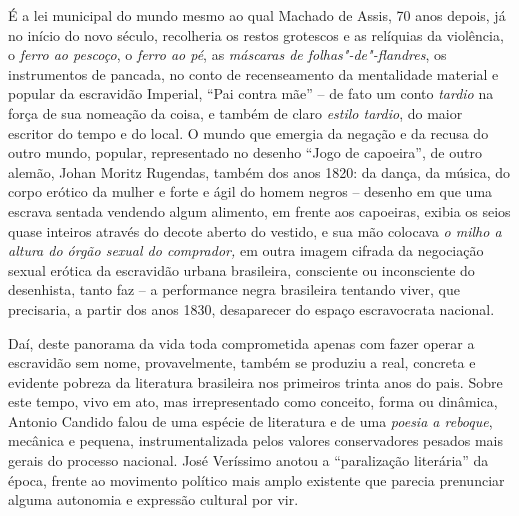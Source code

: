 É a lei municipal do mundo mesmo ao qual Machado de Assis, 70 anos
depois, já no início do novo século, recolheria os restos grotescos e as
relíquias da violência, o \emph{ferro ao pescoço}, o \emph{ferro ao pé},
as \emph{máscaras de folhas"-de"-flandres}, os instrumentos de pancada, no
conto de recenseamento da mentalidade material e popular da escravidão
Imperial, ``Pai contra mãe'' -- de fato um conto \emph{tardio} na força
de sua nomeação da coisa, e também de claro \emph{estilo tardio}, do
maior escritor do tempo e do local. O mundo que emergia da negação e da
recusa do outro mundo, popular, representado no desenho ``Jogo de
capoeira'', de outro alemão, Johan Moritz Rugendas, também dos anos
1820: da dança, da música, do corpo erótico da mulher e forte e ágil do
homem negros -- desenho em que uma escrava sentada vendendo algum
alimento, em frente aos capoeiras, exibia os seios quase inteiros
através do decote aberto do vestido, e sua mão colocava \emph{o milho a
altura do órgão sexual do comprador,} em outra imagem cifrada da
negociação sexual erótica da escravidão urbana brasileira, consciente ou
inconsciente do desenhista, tanto faz -- a performance negra brasileira
tentando viver, que precisaria, a partir dos anos 1830, desaparecer do
espaço escravocrata nacional.

Daí, deste panorama da vida toda comprometida apenas com fazer operar a
escravidão sem nome, provavelmente, também se produziu a real, concreta
e evidente pobreza da literatura brasileira nos primeiros trinta anos do
pais. Sobre este tempo, vivo em ato, mas irrepresentado como conceito,
forma ou dinâmica, Antonio Candido falou de uma espécie de literatura e
de uma \emph{poesia a reboque}, mecânica e pequena, instrumentalizada
pelos valores conservadores pesados mais gerais do processo nacional.
José Veríssimo anotou a ``paralização literária'' da época, frente ao
movimento político mais amplo existente que parecia prenunciar alguma
autonomia e expressão cultural por vir.

